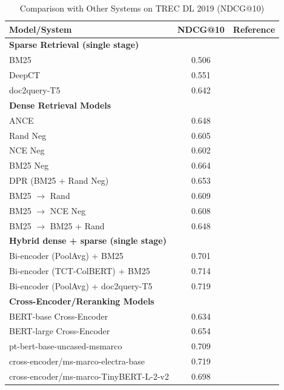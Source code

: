 \documentclass[conference]{IEEEtran}
\begin{document}
\begin{table}[htbp]
\centering
\caption{Comparison with Other Systems on TREC DL 2019 (NDCG@10)}
\label{tab:sota_comparison}
\begin{tabular}{l c c}
\toprule
\textbf{Model/System} & \textbf{NDCG@10} & \textbf{Reference} \\
\midrule
\midrule
\textbf{Sparse Retrieval (single stage)} & & \\
\midrule
BM25 & 0.506 & \cite{lin2020distill} \\
DeepCT & 0.551 & \cite{gao2021complementing} \\
doc2query-T5 & 0.642 & \cite{Lin2021PretrainedTF} \\
\midrule
\textbf{Dense Retrieval Models} & & \\
\midrule
ANCE & 0.648 & \cite{xiong2020approximate} \\
Rand Neg & 0.605 & \cite{xiong2020approximate} \\
NCE Neg & 0.602 & \cite{xiong2020approximate} \\
BM25 Neg & 0.664 & \cite{xiong2020approximate} \\
DPR (BM25 + Rand Neg) & 0.653 & \cite{xiong2020approximate} \\
BM25 $\rightarrow$ Rand & 0.609 & \cite{xiong2020approximate} \\
BM25 $\rightarrow$ NCE Neg & 0.608 & \cite{xiong2020approximate} \\
BM25 $\rightarrow$ BM25 + Rand & 0.648 & \cite{xiong2020approximate} \\
\midrule
\textbf{Hybrid dense + sparse (single stage)} & & \\
\midrule
Bi-encoder (PoolAvg) + BM25 & 0.701 & \cite{lin2020distill} \\
Bi-encoder (TCT-ColBERT) + BM25 & 0.714 & \cite{lin2020distill} \\
Bi-encoder (PoolAvg) + doc2query-T5 & 0.719 & \cite{lin2020distill} \\
\midrule
\textbf{Cross-Encoder/Reranking Models} & & \\
\midrule
BERT-base Cross-Encoder & 0.634 & \cite{Lin2021PretrainedTF} \\
BERT-large Cross-Encoder & 0.654 & \cite{Lin2021PretrainedTF} \\
pt-bert-base-uncased-msmarco & 0.709 & \cite{koursaros2019NBoost} \\
cross-encoder/ms-marco-electra-base & 0.719 & \cite{reimers2019sentence} \\
cross-encoder/ms-marco-TinyBERT-L-2-v2 & 0.698 & \cite{reimers2019sentence} \\

\end{tabular}
\end{table}
\end{document}

